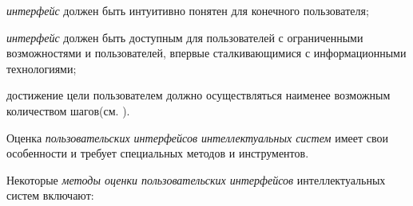 \begin{textitemize}
	\item \textit{интерфейс} должен быть интуитивно понятен для конечного пользователя;
	\item \textit{интерфейс} должен быть доступным для пользователей с ограниченными возможностями и пользователей, впервые сталкивающимися с информационными технологиями;
	\item достижение цели пользователем должно осуществляться наименее возможным количеством шагов(см. ).
\end{textitemize}

Оценка \textit{пользовательских интерфейсов интеллектуальных систем} имеет свои особенности и требует специальных методов и инструментов.

Некоторые \textit{методы оценки пользовательских интерфейсов} интеллектуальных систем включают:
